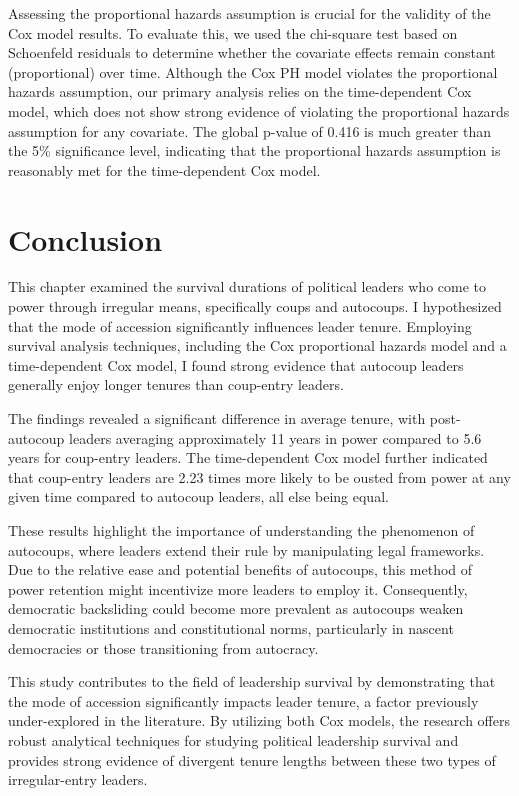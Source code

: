 \documentclass[
  12pt,
]{report}
\begin{document}
Assessing the proportional hazards assumption is crucial for the
validity of the Cox model results. To evaluate this, we used the
chi-square test based on Schoenfeld residuals to determine whether the
covariate effects remain constant (proportional) over time. Although the
Cox PH model violates the proportional hazards assumption, our primary
analysis relies on the time-dependent Cox model, which does not show
strong evidence of violating the proportional hazards assumption for any
covariate. The global p-value of 0.416 is much greater than the 5\%
significance level, indicating that the proportional hazards assumption
is reasonably met for the time-dependent Cox model.

\section{Conclusion}\label{conclusion-2}

This chapter examined the survival durations of political leaders who
come to power through irregular means, specifically coups and autocoups.
I hypothesized that the mode of accession significantly influences
leader tenure. Employing survival analysis techniques, including the Cox
proportional hazards model and a time-dependent Cox model, I found
strong evidence that autocoup leaders generally enjoy longer tenures
than coup-entry leaders.

The findings revealed a significant difference in average tenure, with
post-autocoup leaders averaging approximately 11 years in power compared
to 5.6 years for coup-entry leaders. The time-dependent Cox model
further indicated that coup-entry leaders are 2.23 times more likely to
be ousted from power at any given time compared to autocoup leaders, all
else being equal.

These results highlight the importance of understanding the phenomenon
of autocoups, where leaders extend their rule by manipulating legal
frameworks. Due to the relative ease and potential benefits of
autocoups, this method of power retention might incentivize more leaders
to employ it. Consequently, democratic backsliding could become more
prevalent as autocoups weaken democratic institutions and constitutional
norms, particularly in nascent democracies or those transitioning from
autocracy.

This study contributes to the field of leadership survival by
demonstrating that the mode of accession significantly impacts leader
tenure, a factor previously under-explored in the literature. By
utilizing both Cox models, the research offers robust analytical
techniques for studying political leadership survival and provides
strong evidence of divergent tenure lengths between these two types of
irregular-entry leaders.
\end{document}
